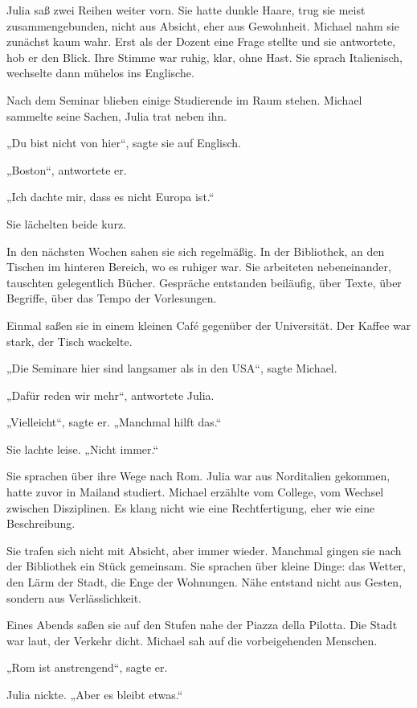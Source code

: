 \documentclass[
]{article}
\begin{document}
Julia saß zwei Reihen weiter vorn. Sie hatte dunkle Haare, trug sie meist zusammengebunden, nicht aus Absicht, eher aus Gewohnheit. Michael nahm sie zunächst kaum wahr. Erst als der Dozent eine Frage stellte und sie antwortete, hob er den Blick. Ihre Stimme war ruhig, klar, ohne Hast. Sie sprach Italienisch, wechselte dann mühelos ins Englische.

Nach dem Seminar blieben einige Studierende im Raum stehen. Michael sammelte seine Sachen, Julia trat neben ihn.

„Du bist nicht von hier``, sagte sie auf Englisch.

„Boston``, antwortete er.

„Ich dachte mir, dass es nicht Europa ist.``

Sie lächelten beide kurz.

In den nächsten Wochen sahen sie sich regelmäßig. In der Bibliothek, an den Tischen im hinteren Bereich, wo es ruhiger war. Sie arbeiteten nebeneinander, tauschten gelegentlich Bücher. Gespräche entstanden beiläufig, über Texte, über Begriffe, über das Tempo der Vorlesungen.

Einmal saßen sie in einem kleinen Café gegenüber der Universität. Der Kaffee war stark, der Tisch wackelte.

„Die Seminare hier sind langsamer als in den USA``, sagte Michael.

„Dafür reden wir mehr``, antwortete Julia.

„Vielleicht``, sagte er. „Manchmal hilft das.``

Sie lachte leise. „Nicht immer.``

Sie sprachen über ihre Wege nach Rom. Julia war aus Norditalien gekommen, hatte zuvor in Mailand studiert. Michael erzählte vom College, vom Wechsel zwischen Disziplinen. Es klang nicht wie eine Rechtfertigung, eher wie eine Beschreibung.

Sie trafen sich nicht mit Absicht, aber immer wieder. Manchmal gingen sie nach der Bibliothek ein Stück gemeinsam. Sie sprachen über kleine Dinge: das Wetter, den Lärm der Stadt, die Enge der Wohnungen. Nähe entstand nicht aus Gesten, sondern aus Verlässlichkeit.

Eines Abends saßen sie auf den Stufen nahe der Piazza della Pilotta. Die Stadt war laut, der Verkehr dicht. Michael sah auf die vorbeigehenden Menschen.

„Rom ist anstrengend``, sagte er.

Julia nickte. „Aber es bleibt etwas.``
\end{document}
